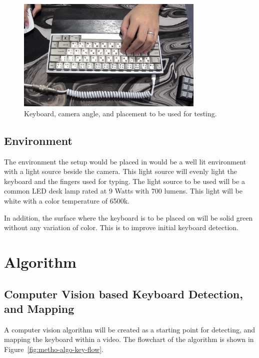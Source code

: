 \documentclass{report}
\begin{document}
\begin{figure}[H]
	\centering
	\includegraphics[width=0.8\textwidth]{actual-keeb.png}
	\caption{Keyboard, camera angle, and placement to be used for testing.}
	\label{fig:metho-keeb}
\end{figure}


\subsection{Environment}
The environment the setup would be placed in would be a well lit environment
with a light source beside the camera. This light source will evenly light the
keyboard and the fingers used for typing. The light source to be used will be a
common LED desk lamp rated at 9 Watts with 700 lumens. This light will be white
with a color temperature of 6500k.

In addition, the surface where the keyboard is to be placed on will be solid
green without any variation of color. This is to improve initial keyboard
detection.

\section{Algorithm}
\label{section:metho-algo}

\subsection{Computer Vision based Keyboard Detection, and Mapping}
\label{section:metho-algo-keyboard}

A computer vision algorithm will be created as a starting point for detecting,
and mapping the keyboard within a video. The flowchart of the algorithm is shown
in Figure~\ref{fig:metho-algo-key-flow}.
\end{document}
